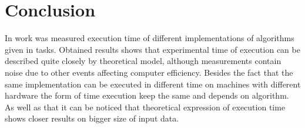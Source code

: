 \section*{Conclusion}

In work was measured execution time of different implementations of algorithms given in tasks.
Obtained results shows that experimental time of execution can be described quite closely by theoretical model, 
although measurements contain noise due to other events affecting computer efficiency. Besides the fact that
the same implementation can be executed in different time on machines with different hardware the form of time execution 
keep the same and depends on algorithm. As well as that it can be noticed that theoretical expression of execution time shows closer results on
bigger size of input data.